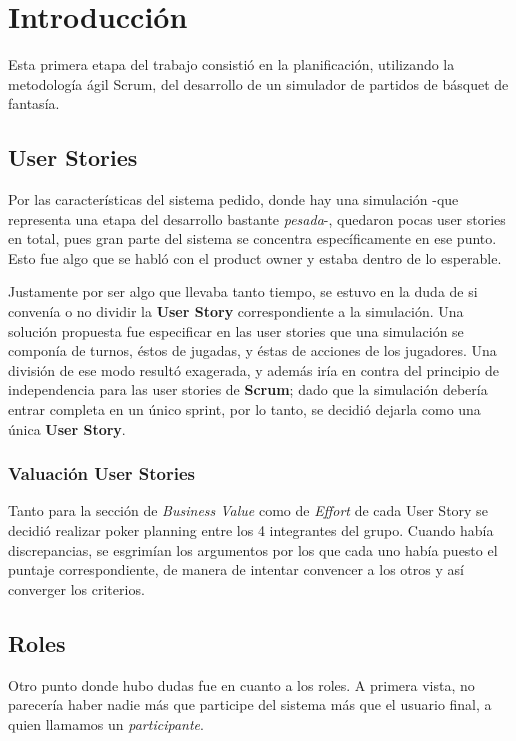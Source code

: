 \section{Introducción}
\indent \indent Esta primera etapa del trabajo consistió en la planificación, utilizando la metodología ágil Scrum, del desarrollo de un simulador de partidos de básquet de fantasía.

\subsection*{User Stories}
Por las características del sistema pedido, donde hay una simulación -que representa una etapa del desarrollo bastante \emph{pesada}-, quedaron pocas user stories en total, pues gran parte del sistema se concentra específicamente en ese punto. Esto fue algo que se habló con el product owner y estaba dentro de lo esperable.

Justamente por ser algo que llevaba tanto tiempo, se estuvo en la duda de si convenía o no dividir la \textbf{User Story} correspondiente a la simulación. Una solución propuesta fue especificar en las user stories que una simulación se componía de turnos, éstos de jugadas, y éstas de acciones de los jugadores. Una división de ese modo resultó exagerada, y además iría en contra del principio de independencia para las user stories de \textbf{Scrum}; dado que la simulación debería entrar completa en un único sprint, por lo tanto, se decidió dejarla como una única \textbf{User Story}.

\subsubsection*{Valuación User Stories}
Tanto para la sección de \emph{Business Value} como de \emph{Effort} de cada User Story se decidió realizar poker planning entre los 4 integrantes del grupo. Cuando había discrepancias, se esgrimían los argumentos por los que cada uno había puesto el puntaje correspondiente, de manera de intentar convencer a los otros y así converger los criterios.

\subsection*{Roles}
Otro punto donde hubo dudas fue en cuanto a los roles. A primera vista, no parecería haber nadie más que participe del sistema más que el usuario final, a quien llamamos un \emph{participante}. 

